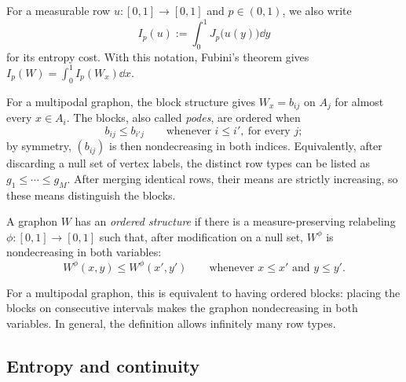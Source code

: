 For a measurable row $u:[0,1]\to[0,1]$ and $p\in(0,1)$, we also write
\[
  I_p(u):=\int_0^1J_p\bigl(u(y)\bigr)\dd y
\]
for its entropy cost. With this notation, Fubini's theorem gives
$I_p(W)=\int_0^1I_p(W_x)\dd x$.

For a multipodal graphon, the block structure gives $W_x=b_{ij}$ on $A_j$
for almost every $x\in A_i$.
The blocks, also called \emph{podes}, are ordered when
\begin{equation}\label{eq:ordered-blocks}
  b_{ij}\le b_{i'j}\qquad\text{whenever }i\le i',\ \text{for every }j;
\end{equation}
by symmetry, $(b_{ij})$ is then nondecreasing in both indices.
Equivalently, after discarding a null set of vertex labels, the distinct
row types can be listed as $g_1\le\cdots\le g_M$.
After merging identical rows, their means are strictly increasing, so
these means distinguish the blocks.

\begin{defn}\label{def:ordered-structure}
A graphon $W$ has an \emph{ordered structure} if there is a
measure-preserving relabeling $\phi:[0,1]\to[0,1]$ such that, after
modification on a null set, $W^\phi$ is nondecreasing in both variables:
\[
  W^\phi(x,y)\le W^\phi(x',y')
  \qquad\text{whenever }x\le x'\text{ and }y\le y'.
\]
\end{defn}

For a multipodal graphon, this is equivalent to having ordered blocks:
placing the blocks on consecutive intervals makes the graphon
nondecreasing in both variables. In general, the definition allows infinitely
many row types.

\subsection{Entropy and continuity}\label{sec:relative-entropy}

